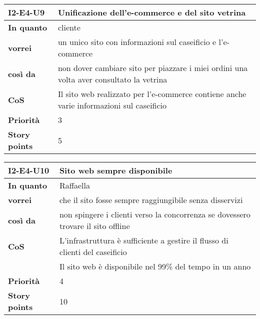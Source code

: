 \begin{table}[H]
  \begin{tabularx}{\textwidth}{lX}
    \toprule
    \textbf{I2-E4-U9} & \textbf{Unificazione dell'e-commerce e del sito vetrina} \\
    \midrule
    \textbf{In quanto} & cliente \\
    \textbf{vorrei} & un unico sito con informazioni sul caseificio e l'e-commerce \\
    \textbf{così da} & non dover cambiare sito per piazzare i miei ordini una volta aver consultato la vetrina \\
    \midrule
    \textbf{CoS} & Il sito web realizzato per l'e-commerce contiene anche varie informazioni sul caseificio \\ 
    \midrule
    \textbf{Priorità} & 3 \\
    \textbf{Story points} & 5 \\
    \bottomrule
  \end{tabularx}
  \label{user-story:i2-e4-u9}
\end{table}

\begin{table}[H]
  \begin{tabularx}{\textwidth}{lX}
    \toprule
    \textbf{I2-E4-U10} & \textbf{Sito web sempre disponibile} \\
    \midrule
    \textbf{In quanto} & Raffaella \\
    \textbf{vorrei} & che il sito fosse sempre raggiungibile senza disservizi \\
    \textbf{così da} & non spingere i clienti verso la concorrenza se dovessero trovare il sito offline \\
    \midrule
    \textbf{CoS} & L'infrastruttura è sufficiente a gestire il flusso di clienti del caseificio \\
    & Il sito web è disponibile nel 99\% del tempo in un anno \\
    \midrule
    \textbf{Priorità} & 4 \\
    \textbf{Story points} & 10 \\
    \bottomrule
  \end{tabularx}
  \label{user-story:i2-e4-u10}
\end{table}

